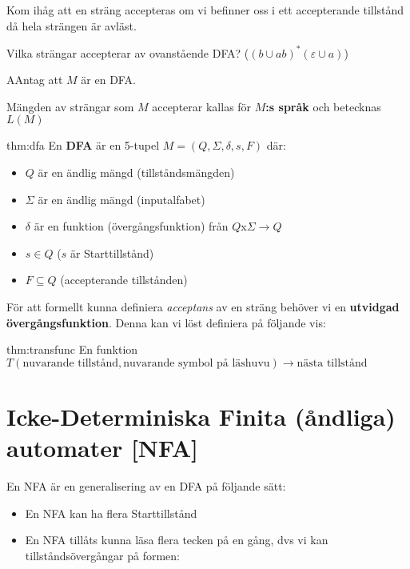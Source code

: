 \par\bigskip
\noindent Kom ihåg att en sträng accepteras om vi befinner oss i ett accepterande tillstånd då hela strängen är avläst.\par
\noindent Vilka strängar accepterar av ovanstående DFA? ($(b\cup ab)^*(\varepsilon\cup a)$)
\par\bigskip
\begin{theo}
  AAntag att $M$ är en DFA.\par
  \noindent Mängden av strängar som $M$ accepterar kallas för \textbf{$M$:s språk} och betecknas $L(M)$
\end{theo}
\par\bigskip
\begin{theo}{thm:dfa}
  En \textbf{DFA} är en 5-tupel $M = (Q,\Sigma,\delta,s,F)$ där:\par
  \begin{itemize}
    \item $Q$ är en ändlig mängd (tillståndsmängden)
    \item $\Sigma$ är en ändlig mängd (inputalfabet)
    \item $\delta$ är en funktion (övergångsfunktion) från $Q$x$\Sigma\to Q$
    \item $s\in Q$ ($s$ är Starttillstånd)
    \item $F\subseteq Q$ (accepterande tillstånden)
  \end{itemize}
\end{theo}
\par\bigskip
\noindent För att formellt kunna definiera \textit{acceptans} av en sträng behöver vi en \textbf{utvidgad övergångsfunktion}. Denna kan vi löst definiera på följande vis:
\par\bigskip
\begin{theo}{thm:transfunc}
  En funktion $T(\text{nuvarande tillstånd}, \text{nuvarande symbol på läshuvu})\to\text{nästa tillstånd}$
\end{theo}
\newpage
\section{Icke-Determiniska Finita (åndliga) automater [NFA]}
\par\bigskip
\noindent En NFA är en generalisering av en DFA på följande sätt:\par
\begin{itemize}
  \item En NFA kan ha flera Starttillstånd
  \item En NFA tillåts kunna läsa flera tecken på en gång, dvs vi kan tillståndsövergångar på formen:
\end{itemize}
\begin{figure}[ht]
    \centering
    \caption{}
\end{figure}
